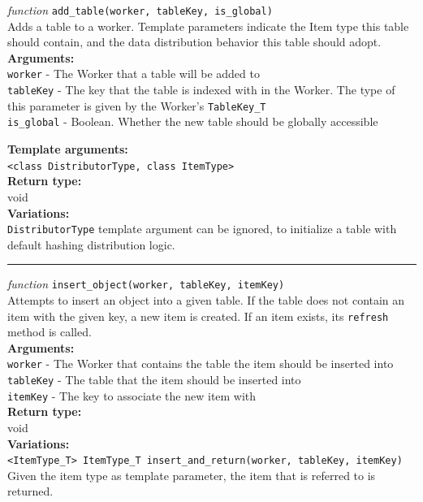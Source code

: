 \documentclass{uit-report}
\begin{document}
\newpage
\textit{function} \texttt{add\_table(worker, tableKey, is\_global)}\\
\phantom{11111} Adds a table to a worker. Template parameters indicate the Item type this table should contain, and the data distribution behavior this table should adopt.\\
\textbf{Arguments:}\\
\phantom{11111} \texttt{worker} - The Worker that a table will be added to\\
\phantom{11111} \texttt{tableKey} - The key that the table is indexed with in the Worker. The type of this parameter is given by the Worker's \texttt{TableKey\_T}\\
\phantom{11111} \texttt{is\_global} - Boolean. Whether the new table should be globally accessible

\textbf{Template arguments:}\\
\phantom{11111} \texttt{<class DistributorType, class ItemType>}\\
\textbf{Return type:}\\
\phantom{11111}  void\\
\textbf{Variations:}\\
\phantom{11111} \texttt{DistributorType} template argument can be ignored, to initialize a table with default hashing distribution logic.

\vskip 0.05cm
\begin{center}
	\noindent\rule{4cm}{1.2pt}
\end{center}
\vskip 0.15cm
\textit{function} \texttt{insert\_object(worker, tableKey, itemKey)}\\
\phantom{11111} Attempts to insert an object into a given table. If the table does not contain an item with the given key, a new item is created. If an item exists, its \texttt{refresh} method is called.  \\
\textbf{Arguments:}\\
\phantom{11111} \texttt{worker} - The Worker that contains the table the item should be inserted into\\
\phantom{11111} \texttt{tableKey} - The table that the item should be inserted into\\
\phantom{11111} \texttt{itemKey} - The key to associate the new item with\\
\textbf{Return type:}\\
\phantom{11111}  void\\
\textbf{Variations:}\\
\phantom{11111} \texttt{<ItemType\_T> ItemType\_T insert\_and\_return(worker, tableKey, itemKey)}\\
\phantom{11111}\phantom{11111} Given the item type as template parameter, the item that is referred to is returned.
\newpage
\end{document}
